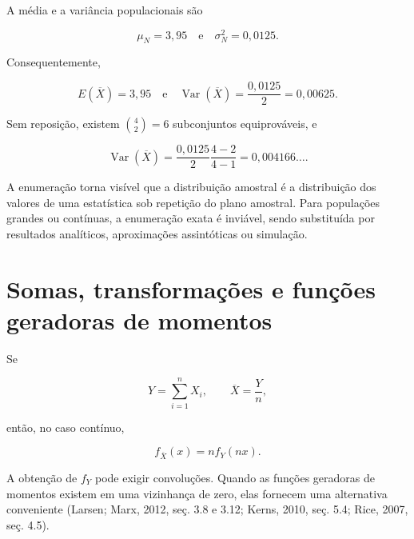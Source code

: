 \documentclass[
  letterpaper,
  DIV=11,
  numbers=noendperiod]{scrreprt}
\begin{document}
\begin{tcolorbox}
A média e a variância populacionais são

\[\mu_N=3{,}95
\quad\text{e}\quad
\sigma_N^2=0{,}0125.\]

Consequentemente,

\[E(\overline{X})=3{,}95
\quad\text{e}\quad
\operatorname{Var}(\overline{X})=\frac{0{,}0125}{2}=0{,}00625.\]

Sem reposição, existem \(\binom{4}{2}=6\) subconjuntos equiprováveis, e

\[\operatorname{Var}(\overline{X})
=
\frac{0{,}0125}{2}\frac{4-2}{4-1}
=
0{,}004166\ldots.\]

\end{tcolorbox}

\begin{tcolorbox}[enhanced jigsaw, colback=white, leftrule=.75mm, colbacktitle=quarto-callout-note-color!10!white, breakable, titlerule=0mm, bottomtitle=1mm, title=\textcolor{quarto-callout-note-color}{\faInfo}\hspace{0.5em}{Interpretação}, colframe=quarto-callout-note-color-frame, toprule=.15mm, opacityback=0, bottomrule=.15mm, opacitybacktitle=0.6, arc=.35mm, toptitle=1mm, rightrule=.15mm, coltitle=black, left=2mm]

A enumeração torna visível que a distribuição amostral é a distribuição
dos valores de uma estatística sob repetição do plano amostral. Para
populações grandes ou contínuas, a enumeração exata é inviável, sendo
substituída por resultados analíticos, aproximações assintóticas ou
simulação.

\end{tcolorbox}

\section{Somas, transformações e funções geradoras de
momentos}\label{somas-transformauxe7uxf5es-e-funuxe7uxf5es-geradoras-de-momentos}

Se

\[Y=\sum_{i=1}^n X_i,
\qquad
\overline{X}=\frac{Y}{n},\]

então, no caso contínuo,

\[f_{\overline{X}}(x)=n f_Y(nx).\]

A obtenção de \(f_Y\) pode exigir convoluções. Quando as funções
geradoras de momentos existem em uma vizinhança de zero, elas fornecem
uma alternativa conveniente (Larsen; Marx, 2012, seç. 3.8 e 3.12; Kerns,
2010, seç. 5.4; Rice, 2007, seç. 4.5).
\end{document}
